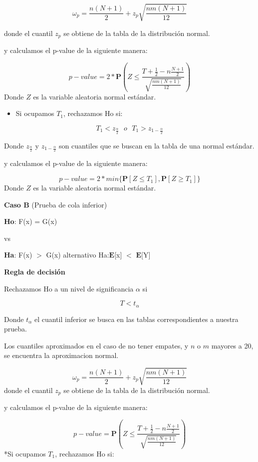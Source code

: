 \documentclass[a4paper,oneside,openany]{book}
\providecommand{\tightlist}{%
  \setlength{\itemsep}{0pt}\setlength{\parskip}{0pt}}
\begin{document}
\[\omega_p= \frac{n(N+1)}{2} + z_p\sqrt{\frac{n m(N+1)}{12}}\]

donde el cuantil \(z_p\) se obtiene de la tabla de la distribución
normal.

y calculamos el p-value de la siguiente manera:

\[p-value = 2*\mathbf{P}\left(Z\leq\frac{T+\frac{1}{2}-n\frac{N+1}{2}}{\sqrt{\frac{nm(N+1)}{12}}}\right)\]
Donde \(Z\) es la variable aleatoria normal estándar.

\begin{itemize}
\tightlist
\item
  Si ocupamos \(T_{1}\), rechazamos Ho si:
\end{itemize}

\[T_{1} < z_{\frac{\alpha}{2}} \ \ \  o \ \ \  T_{1} > z_{1-\frac{\alpha}{2}}\]

Donde \(z_\frac{\alpha}{2}\) y \(z_{1-\frac{\alpha}{2}}\) son cuantiles
que se buscan en la tabla de una normal estándar.

y calculamos el p-value de la siguiente manera:

\[p-value=2*min\{\mathbf{P}[Z\leq T_{1}],\mathbf{P}[Z\geq T_{1}]\}\]
Donde \(Z\) es la variable aleatoria normal estándar.

\textbf{Caso B} (Prueba de cola inferior)

\textbf{Ho}: F(x) = G(x)

vs

\textbf{Ha}: F(x) \(>\) G(x) alternativo Ha:\(\mathbf{E}\){[}x{]} \(<\)
\(\mathbf{E}\){[}Y{]}

\textbf{Regla de decisión}

Rechazamos Ho a un nivel de significancia \(\alpha\) si

\[T < t_{\alpha}\]

Donde \(t_{\alpha}\) el cuantil inferior se busca en las tablas
correspondientes a nuestra prueba.

Los cuantiles aproximados en el caso de no tener empates, y \(n\) o
\(m\) mayores a 20, se encuentra la aproximacion normal.

\[\omega_p= \frac{n(N+1)}{2} + z_p\sqrt{\frac{n m(N+1)}{12}}\] donde el
cuantil \(z_p\) se obtiene de la tabla de la distribución normal.

y calculamos el p-value de la siguiente manera:

\[p-value = \mathbf{P}\left(Z\leq\frac{T+\frac{1}{2}-n\frac{N+1}{2}}{\sqrt{\frac{nm(N+1)}{12}}}\right)\]
*Si ocupamos \(T_{1}\), rechazamos Ho si:
\end{document}
